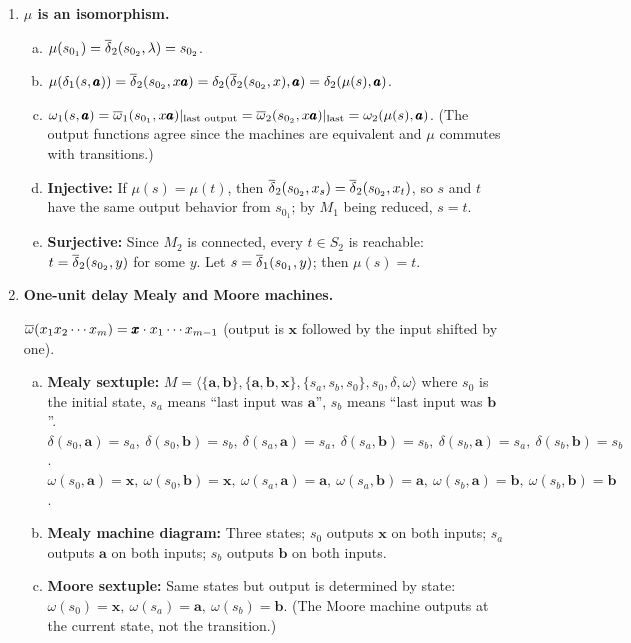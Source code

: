 \begin{enumerate}[{7.}1.]
\item \textbf{$\mu$ is an isomorphism.}

\begin{enumerate}[(a)]
  \item $\mu(s_{0_1})=\overline{\delta}_2(s_{0_2},\lambda)=s_{0_2}$.
  \item $\mu(\delta_1(s,\pmb{a}))=\overline{\delta}_2(s_{0_2},x\pmb{a})=\delta_2(\overline{\delta}_2(s_{0_2},x),\pmb{a})=\delta_2(\mu(s),\pmb{a})$.
  \item $\omega_1(s,\pmb{a})=\overline{\omega}_1(s_{0_1},x\pmb{a})|_{\text{last output}}=\overline{\omega}_2(s_{0_2},x\pmb{a})|_{\text{last}}=\omega_2(\mu(s),\pmb{a})$.  (The output functions agree since the machines are equivalent and $\mu$ commutes with transitions.)
  \item \textbf{Injective:} If $\mu(s)=\mu(t)$, then $\overline{\delta}_2(s_{0_2},x_s)=\overline{\delta}_2(s_{0_2},x_t)$, so $s$ and $t$ have the same output behavior from $s_{0_1}$; by $M_1$ being reduced, $s=t$.
  \item \textbf{Surjective:} Since $M_2$ is connected, every $t\in S_2$ is reachable: $t=\overline{\delta}_2(s_{0_2},y)$ for some $y$.  Let $s=\overline{\delta}_1(s_{0_1},y)$; then $\mu(s)=t$.
\end{enumerate}

\item \textbf{One-unit delay Mealy and Moore machines.}

$\overline{\omega}(x_1x_2\cdots x_m)=\pmb{x}\cdot x_1\cdots x_{m-1}$ (output is $\pmb{x}$ followed by the input shifted by one).

\begin{enumerate}[(a)]
  \item \textbf{Mealy sextuple:}
  $M=\langle\{\pmb{a},\pmb{b}\},\{\pmb{a},\pmb{b},\pmb{x}\},\{s_a,s_b,s_0\},s_0,\delta,\omega\rangle$ where $s_0$ is the initial state, $s_a$ means ``last input was $\pmb{a}$'', $s_b$ means ``last input was $\pmb{b}$''.
  $\delta(s_0,\pmb{a})=s_a,\ \delta(s_0,\pmb{b})=s_b,\ \delta(s_a,\pmb{a})=s_a,\ \delta(s_a,\pmb{b})=s_b,\ \delta(s_b,\pmb{a})=s_a,\ \delta(s_b,\pmb{b})=s_b$.
  $\omega(s_0,\pmb{a})=\pmb{x},\ \omega(s_0,\pmb{b})=\pmb{x},\ \omega(s_a,\pmb{a})=\pmb{a},\ \omega(s_a,\pmb{b})=\pmb{a},\ \omega(s_b,\pmb{a})=\pmb{b},\ \omega(s_b,\pmb{b})=\pmb{b}$.

  \item \textbf{Mealy machine diagram:} Three states; $s_0$ outputs $\pmb{x}$ on both inputs; $s_a$ outputs $\pmb{a}$ on both inputs; $s_b$ outputs $\pmb{b}$ on both inputs.

  \item \textbf{Moore sextuple:}  Same states but output is determined by state:
  $\omega(s_0)=\pmb{x},\ \omega(s_a)=\pmb{a},\ \omega(s_b)=\pmb{b}$.
  (The Moore machine outputs at the current state, not the transition.)


\end{enumerate}
\end{enumerate}
